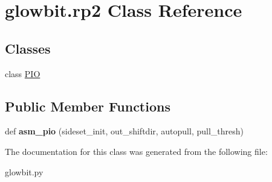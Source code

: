 \hypertarget{classglowbit_1_1rp2}{}\section{glowbit.\+rp2 Class Reference}
\label{classglowbit_1_1rp2}
\subsection*{Classes}
\begin{DoxyCompactItemize}
\item 
class \hyperlink{classglowbit_1_1rp2_1_1PIO}{P\+IO}
\end{DoxyCompactItemize}
\subsection*{Public Member Functions}
\begin{DoxyCompactItemize}
\item 
\mbox{\label{classglowbit_1_1rp2_a321dce63b34c6d482a065b96bf1f5ab6}} 
def {\bfseries asm\+\_\+pio} (sideset\+\_\+init, out\+\_\+shiftdir, autopull, pull\+\_\+thresh)
\end{DoxyCompactItemize}


The documentation for this class was generated from the following file\+:\begin{DoxyCompactItemize}
\item 
glowbit.\+py\end{DoxyCompactItemize}
